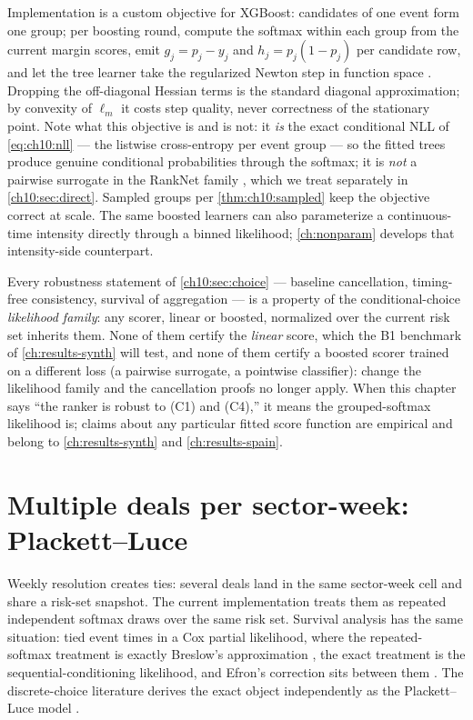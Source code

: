 Implementation is a custom objective for XGBoost: candidates of one event
form one group; per boosting round, compute the softmax within each group
from the current margin scores, emit $g_j = p_j - y_j$ and $h_j = p_j(1 -
p_j)$ per candidate row, and let the tree learner take the regularized
Newton step in function space \citep{chenguestrin2016}. Dropping the
off-diagonal Hessian terms is the standard diagonal approximation; by
convexity of $\ell_m$ it costs step quality, never correctness of the
stationary point. Note what this objective is and is not: it \emph{is}
the exact conditional NLL of \cref{eq:ch10:nll} --- the listwise
cross-entropy per event group --- so the fitted trees produce genuine
conditional probabilities through the softmax; it is \emph{not} a
pairwise surrogate in the RankNet family \citep{burges2005}, which we
treat separately in \cref{ch10:sec:direct}. Sampled groups per
\cref{thm:ch10:sampled} keep the objective correct at scale. The same
boosted learners can also parameterize a continuous-time intensity
directly through a binned likelihood; \cref{ch:nonparam} develops that
intensity-side counterpart.

\begin{warning}\label{warn:ch10:family}
Every robustness statement of \cref{ch10:sec:choice} ---
baseline cancellation, timing-free consistency, survival of aggregation
--- is a property of the conditional-choice \emph{likelihood family}: any
scorer, linear or boosted, normalized over the current risk set inherits
them. None of them certify the \emph{linear} score, which the B1
benchmark of \cref{ch:results-synth} will test, and none of them certify
a boosted scorer trained on a different loss (a pairwise surrogate, a
pointwise classifier): change the likelihood family and the cancellation
proofs no longer apply. When this chapter says ``the ranker is robust to
(C1) and (C4),'' it means the grouped-softmax likelihood is; claims
about any particular fitted score function are empirical and belong to
\cref{ch:results-synth} and \cref{ch:results-spain}.
\end{warning}

\section{Multiple deals per sector-week: Plackett--Luce}\label{ch10:sec:ties}

Weekly resolution creates ties: several deals land in the same
sector-week cell and share a risk-set snapshot. The current
implementation treats them as repeated independent softmax draws over the
same risk set. Survival analysis has the same situation:
tied event times in a Cox partial likelihood, where the repeated-softmax
treatment is exactly Breslow's approximation \citep{breslow1974}, the
exact treatment is the sequential-conditioning likelihood, and Efron's
correction sits between them \citep{efron1977,therneau2000}. The
discrete-choice literature derives the exact object independently as the
Plackett--Luce model \citep{plackett1975,luce1959}.

